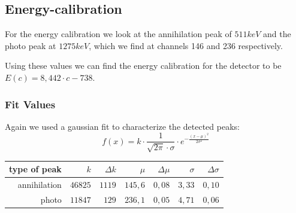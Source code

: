 \documentclass[bigchapter,colorback,accentcolor=tud4b,linedtoc,11pt]{tudreport}
\begin{document}
\subsection{Energy-calibration}
\begin{center}
\begin{figure}[H]
\end{figure}
\end{center}

For the energy calibration we look at the annihilation peak of $511 keV$ and the
photo peak at $1275 keV$, which we find at channels 146 and 236 respectively.

Using these values we can find the energy calibration for the detector to be $E(c) = 8,442 \cdot c - 738$.

\subsubsection{Fit Values}
Again we used a gaussian fit to characterize the detected peaks:
$$f(x) = k\cdot \frac{1}{\sqrt{2 \pi } \cdot \sigma} \cdot e^{-\frac{(x-\mu )^2}{2 \sigma ^2}}$$

\begin{center}
  \begin{tabular}{r|r|r|r|r|r|r}
     type of peak & $k$     & $\Delta k$ & $\mu$   & $\Delta \mu$ & $\sigma$ & $\Delta \sigma$ \\ \hline
     annihilation & $46825$ & $1119$     & $145,6$ & $0,08$       & $3,33$   & $0,10$          \\ \hline
     photo        & $11847$ & $129$      & $236,1$ & $0,05$       & $4,71$   & $0,06$          \\
	\end{tabular}
\end{center}
\end{document}
